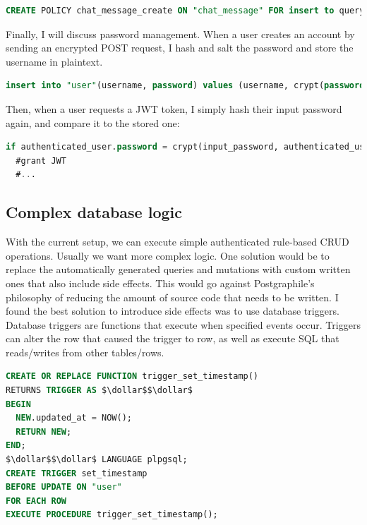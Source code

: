\documentclass{l4proj}
\begin{document}
\begin{lstlisting}[language=SQL, caption={Row level security policy only allowing a user send messages as themselves to their team}, ]
CREATE POLICY chat_message_create ON "chat_message" FOR insert to query_sender with check (username = (select username from active_user()) and groupName = (select groupName from active_user()));
\end{lstlisting}


Finally, I will discuss password management. When a user creates an account by sending an encrypted POST request, I hash and salt the password and store the username in plaintext.

\begin{lstlisting}[language=SQL, caption={Hashing and salting done with pgcrypto}]
insert into "user"(username, password) values (username, crypt(password, gen_salt('bf')));
\end{lstlisting}

Then, when a user requests a JWT token, I simply hash their input password again, and compare it to the stored one:
\begin{lstlisting}[language=SQL, caption={Hashing and salting done with pgcrypto}]
if authenticated_user.password = crypt(input_password, authenticated_user.password) then
  #grant JWT
  #...
\end{lstlisting}

\subsection{Complex database logic}
With the current setup, we can execute simple authenticated rule-based CRUD operations. Usually we want more complex logic. One solution would be to replace the automatically generated queries and mutations with custom written ones that also include side effects. This would go against Postgraphile's philosophy of reducing the amount of source code that needs to be written. I found the best solution to introduce side effects was to use database triggers. Database triggers are functions that execute when specified events occur. Triggers can alter the row that caused the trigger to row, as well as execute SQL that reads/writes from other tables/rows. 


\begin{lstlisting}[language=SQL, caption={Definition of a trigger function which sets the rows' "updated\_at" column to be the current time, and a trigger which calls the function on a user whenever the user is updated.}]
CREATE OR REPLACE FUNCTION trigger_set_timestamp()
RETURNS TRIGGER AS $\dollar$$\dollar$ 
BEGIN
  NEW.updated_at = NOW();
  RETURN NEW;
END;
$\dollar$$\dollar$ LANGUAGE plpgsql;
CREATE TRIGGER set_timestamp
BEFORE UPDATE ON "user"
FOR EACH ROW
EXECUTE PROCEDURE trigger_set_timestamp();
\end{lstlisting}
\end{document}
